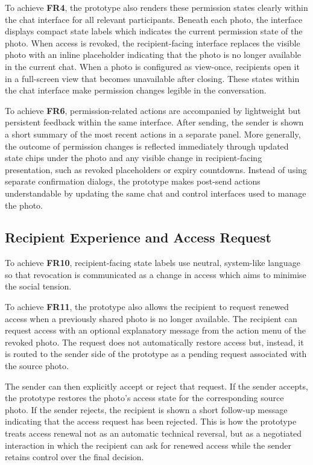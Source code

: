 To achieve \textbf{FR4}, the prototype also renders these permission states clearly within the chat interface for all relevant participants. Beneath each photo, the interface displays compact state labels which indicates the current permission state of the photo. When access is revoked, the recipient-facing interface replaces the visible photo with an inline placeholder indicating that the photo is no longer available in the current chat. When a photo is configured as view-once, recipients open it in a full-screen view that becomes unavailable after closing. These states within the chat interface make permission changes legible in the conversation.

To achieve \textbf{FR6}, permission-related actions are accompanied by lightweight but persistent feedback within the same interface. After sending, the sender is shown a short summary of the most recent actions in a separate panel. More generally, the outcome of permission changes is reflected immediately through updated state chips under the photo and any visible change in recipient-facing presentation, such as revoked placeholders or expiry countdowns. Instead of using separate confirmation dialogs, the prototype makes post-send actions understandable by updating the same chat and control interfaces used to manage the photo.

\subsection{Recipient Experience and Access Request}
To achieve \textbf{FR10}, recipient-facing state labels use neutral, system-like language so that revocation is communicated as a change in access which aims to minimise the social tension.

To achieve \textbf{FR11}, the prototype also allows the recipient to request renewed access when a previously shared photo is no longer available. 
The recipient can request access with an optional explanatory message from the action menu of the revoked photo. The request does not automatically restore access but, instead, it is routed to the sender side of the prototype as a pending request associated with the source photo.

The sender can then explicitly accept or reject that request. If the sender accepts, the prototype restores the photo’s access state for the corresponding source photo. If the sender rejects, the recipient is shown a short follow-up message indicating that the access request has been rejected. This is how the prototype treats access renewal not as an automatic technical reversal, but as a negotiated interaction in which the recipient can ask for renewed access while the sender retains control over the final decision.


